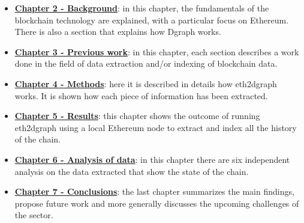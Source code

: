 \begin{itemize}
    \item \hyperref[chapter-2]{\textbf{Chapter 2 - Background}}: in this chapter, the fundamentals of the blockchain technology are explained, with a particular focus on Ethereum. There is also a section that explains how Dgraph works. 
    \item \hyperref[chapter-3]{\textbf{Chapter 3 - Previous work}}: in this chapter, each section describes a work done in the field of data extraction and/or indexing of blockchain data.
    \item \hyperref[chapter-4]{\textbf{Chapter 4 - Methods}}: here it is described in details how eth2dgraph works. It is shown how each piece of information has been extracted.
    \item \hyperref[chapter-5]{\textbf{Chapter 5 - Results}}: this chapter shows the outcome of running eth2dgraph using a local Ethereum node to extract and index all the history of the chain.  
    \item \hyperref[chapter-6]{\textbf{Chapter 6 - Analysis of data}}: in this chapter there are six independent analysis on the data extracted that show the state of the chain.
    \item \hyperref[chapter-7]{\textbf{Chapter 7 - Conclusions}}: the last chapter summarizes the main findings, propose future work and more generally discusses the upcoming challenges of the sector.
\end{itemize}

